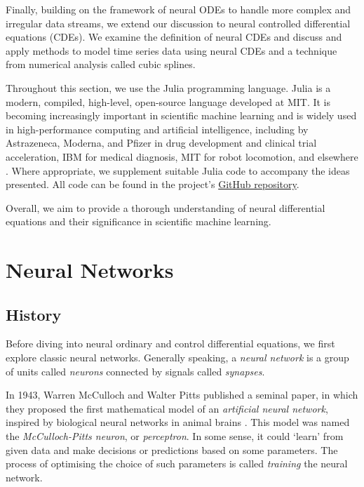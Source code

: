 \documentclass[a4paper,11pt,titlepage]{article}
\theoremstyle{definition}
\theoremstyle{plain}
\theoremstyle{remark}
\begin{document}
Finally, building on the framework of neural ODEs to handle more complex and irregular data streams, we extend our discussion to neural controlled differential equations (CDEs). We examine the definition of neural CDEs and discuss and apply methods to model time series data using neural CDEs and a technique from numerical analysis called cubic splines.

Throughout this section, we use the Julia programming language. Julia is a modern, compiled, high-level, open-source language developed at MIT. It is becoming increasingly important in scientific machine learning and is widely used in high-performance computing and artificial intelligence, including by Astrazeneca, Moderna, and Pfizer in drug development and clinical trial acceleration, IBM for medical diagnosis, MIT for robot locomotion, and elsewhere \cite{SciMLSANUM2024}. Where appropriate, we supplement suitable Julia code to accompany the ideas presented. All code can be found in the project's \href{https://github.com/jaamestaay/M2R-Group-29}{GitHub repository}.

Overall, we aim to provide a thorough understanding of neural differential equations and their significance in scientific machine learning. 

\pagebreak
\section{Neural Networks}
\label{sec:neuralnetworks}
\subsection{History}

Before diving into neural ordinary and control differential equations, we first explore classic neural networks. Generally speaking, a \textit{neural network} is a group of units called \textit{neurons} connected by signals called \textit{synapses}.

In 1943, Warren McCulloch and Walter Pitts published a seminal paper, in which they proposed the first mathematical model of an \textit{artificial neural network}, inspired by biological neural networks in animal brains \cite{McCulloch1943}. This model was named the \textit{McCulloch-Pitts neuron}, or \textit{perceptron}. In some sense, it could ‘learn’ from given data and make decisions or predictions based on some parameters. The process of optimising the choice of such parameters is called \textit{training} the neural network.
\end{document}
